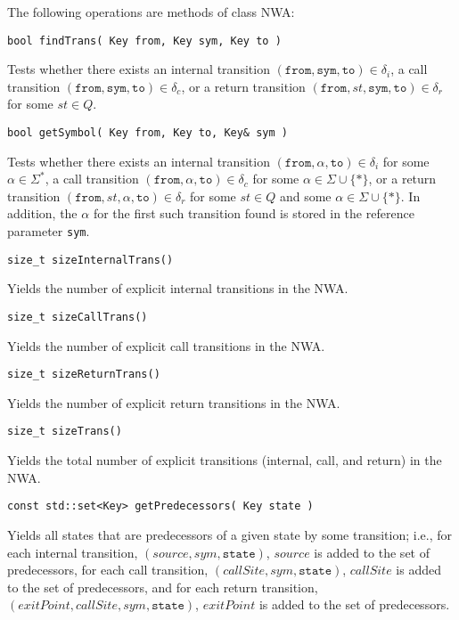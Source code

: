 \noindent The following operations are methods of class NWA:

\begin{description}

  \item\texttt{bool findTrans( Key from, Key sym, Key to )} \nopagebreak

    Tests whether there exists an internal transition
    $(\texttt{from},\texttt{sym},\texttt{to}) \in \delta_i$, a call
    transition $(\texttt{from},\texttt{sym},\texttt{to}) \in \delta_c$, or a
    return transition $(\texttt{from},st,\texttt{sym},\texttt{to}) \in
    \delta_r$ for some $st \in Q$.

  \item\texttt{bool getSymbol( Key from, Key to, Key\& sym )} \nopagebreak

    Tests whether there exists an internal transition
    $(\texttt{from},\alpha,\texttt{to}) \in \delta_i$ for some $\alpha \in
    \Sigma^*$, a call transition $(\texttt{from},\alpha,\texttt{to}) \in
    \delta_c$ for some $\alpha \in \Sigma \cup \{*\}$, or a return transition
    $(\texttt{from},st,\alpha,\texttt{to}) \in \delta_r$ for some $st \in Q$
    and some $\alpha \in \Sigma \cup \{*\}$.  In addition, the $\alpha$ for
    the first such transition found is stored in the reference parameter
    \texttt{sym}.

  \item\texttt{size\_t sizeInternalTrans()} \nopagebreak

    Yields the number of explicit internal transitions in the NWA.

  \item\texttt{size\_t sizeCallTrans()} \nopagebreak

    Yields the number of explicit call transitions in the NWA.

  \item\texttt{size\_t sizeReturnTrans()} \nopagebreak

    Yields the number of explicit return transitions in the NWA.

  \item\texttt{size\_t sizeTrans()} \nopagebreak

    Yields the total number of explicit transitions (internal, call, and
    return) in the NWA.

  \item\texttt{const std::set<Key> getPredecessors( Key state )} \nopagebreak

    Yields all states that are predecessors of a given state by some
    transition; i.e., for each internal transition,
    $(source,sym,\texttt{state})$, $source$ is added to the set of
    predecessors, for each call transition, $(callSite,sym,\texttt{state})$,
    $callSite$ is added to the set of predecessors, and for each return
    transition, $(exitPoint,callSite,sym,\texttt{state})$, $exitPoint$ is
    added to the set of predecessors.


\end{description}
